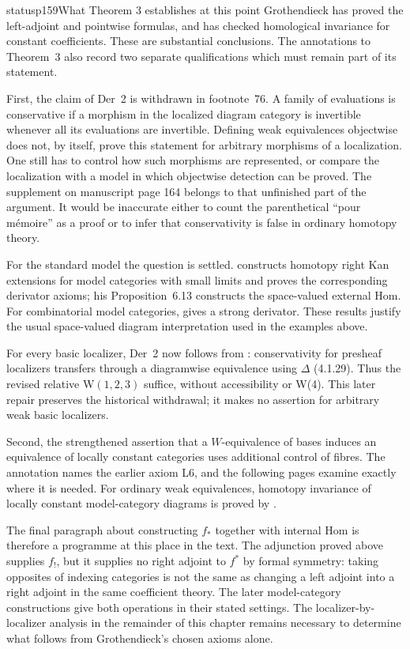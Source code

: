 \begin{dcomment}{status}{p159}{What Theorem 3 establishes at this point}
Grothendieck has proved the left-adjoint and pointwise formulas, and has checked homological invariance for constant coefficients. These are substantial conclusions. The annotations to Theorem~3 also record two separate qualifications which must remain part of its statement.

First, the claim of Der~2 is withdrawn in footnote~76. A family of evaluations is conservative if a morphism in the localized diagram category is invertible whenever all its evaluations are invertible. Defining weak equivalences objectwise does not, by itself, prove this statement for arbitrary morphisms of a localization. One still has to control how such morphisms are represented, or compare the localization with a model in which objectwise detection can be proved. The supplement on manuscript page 164 belongs to that unfinished part of the argument. It would be inaccurate either to count the parenthetical ``pour mémoire'' as a proof or to infer that conservativity is false in ordinary homotopy theory.

For the standard model the question is settled. \citet[Theorem~6.11, including its proof of Der~2]{Cisinski2003} constructs homotopy right Kan extensions for model categories with small limits and proves the corresponding derivator axioms; his Proposition~6.13 constructs the space-valued external Hom. For combinatorial model categories, \citet[Proposition~1.30]{Groth2013} gives a strong derivator. These results justify the usual space-valued diagram interpretation used in the examples above.

For every basic localizer, Der~2 now follows from \citet[Propositions~3.1.30 and~4.2.7]{Cisinski2006}: conservativity for presheaf localizers transfers through a diagramwise equivalence using $\Delta$ (4.1.29). Thus the revised relative W$(1,2,3)$ suffice, without accessibility or W(4). This later repair preserves the historical withdrawal; it makes no assertion for arbitrary weak basic localizers.

Second, the strengthened assertion that a $W$-equivalence of bases induces an equivalence of locally constant categories uses additional control of fibres. The annotation names the earlier axiom L6, and the following pages examine exactly where it is needed. For ordinary weak equivalences, homotopy invariance of locally constant model-category diagrams is proved by \citet[Theorem~1.3]{Cisinski2009LocallyConstant}.

The final paragraph about constructing $f_*$ together with internal Hom is therefore a programme at this place in the text. The adjunction proved above supplies $f_!$, but it supplies no right adjoint to $f^*$ by formal symmetry: taking opposites of indexing categories is not the same as changing a left adjoint into a right adjoint in the same coefficient theory. The later model-category constructions give both operations in their stated settings. The localizer-by-localizer analysis in the remainder of this chapter remains necessary to determine what follows from Grothendieck's chosen axioms alone.
\end{dcomment}


